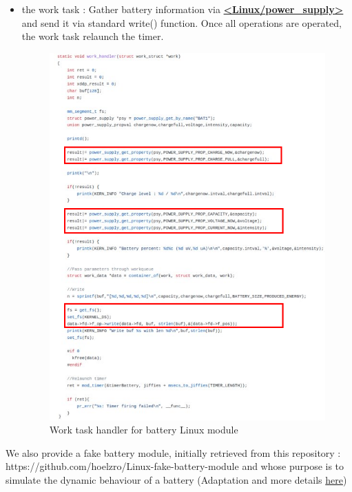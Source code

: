 \documentclass[12pt,hidelinks]{article}
\begin{document}
{\begin{itemize}
	    \newpage \item the work task : Gather battery information via \textbf {\href{https://www.kernel.org/doc/html/latest/power/power_supply_class.html}{<Linux/power\_supply>}} and send it via standard write() function. Once all operations are operated, the work task relaunch the timer.\newline
	  
	    \begin{figure}[!h]
         \centering
    	\includegraphics[scale=0.6]{work_task.png}
    	\caption{Work task handler for battery Linux module}
    	\end{figure} \newline
	  
  	\end{itemize}
	    
         
	    
	
	We also provide a fake battery module, initially retrieved from this repository : https://github.com/hoelzro/Linux-fake-battery-module \newline and whose purpose is to simulate the dynamic behaviour of a battery (Adaptation and more details \href{https://github.com/skyultime/M2_ERTS_Project_Xenomai_edh/tree/dev/SourceCode/fakeBatteryModule}{here})


}
\end{document}
